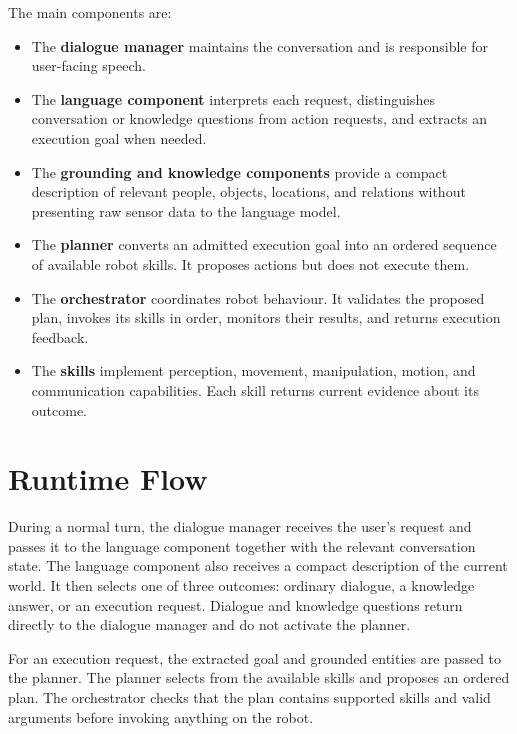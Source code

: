The main components are:

\begin{itemize}
  \item The \textbf{dialogue manager} maintains the conversation and is responsible for user-facing speech.
  \item The \textbf{language component} interprets each request, distinguishes conversation or knowledge questions from action requests, and extracts an execution goal when needed.
  \item The \textbf{grounding and knowledge components} provide a compact description of relevant people, objects, locations, and relations without presenting raw sensor data to the language model.
  \item The \textbf{planner} converts an admitted execution goal into an ordered sequence of available robot skills. It proposes actions but does not execute them.
  \item The \textbf{orchestrator} coordinates robot behaviour. It validates the proposed plan, invokes its skills in order, monitors their results, and returns execution feedback.
  \item The \textbf{skills} implement perception, movement, manipulation, motion, and communication capabilities. Each skill returns current evidence about its outcome.
\end{itemize}


\section{Runtime Flow}

During a normal turn, the dialogue manager receives the user's request and passes it to the language component together with the relevant conversation state. The language component also receives a compact description of the current world. It then selects one of three outcomes: ordinary dialogue, a knowledge answer, or an execution request. Dialogue and knowledge questions return directly to the dialogue manager and do not activate the planner.

For an execution request, the extracted goal and grounded entities are passed to the planner. The planner selects from the available skills and proposes an ordered plan. The orchestrator checks that the plan contains supported skills and valid arguments before invoking anything on the robot.

